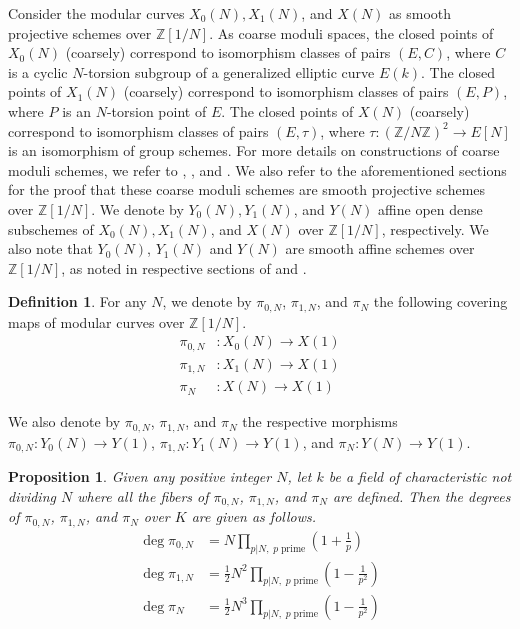 \documentclass[12pt, reqno]{amsart}
\newtheorem{proposition}[theorem]{Proposition}
\theoremstyle{definition}
\newtheorem{definition}[theorem]{Definition}
\newcommand{\Z}{\mathbb{Z}}
\begin{document}
Consider the modular curves $X_0(N), X_1(N)$, and $X(N)$ as smooth projective schemes over $\Z[1/N]$. As coarse moduli spaces, the closed points of $X_0(N)$ (coarsely) correspond to isomorphism classes of pairs $(E,C)$, where $C$ is a cyclic $N$-torsion subgroup of a generalized elliptic curve $E(k)$. The closed points of $X_1(N)$ (coarsely) correspond to isomorphism classes of pairs $(E,P)$, where $P$ is an $N$-torsion point of $E$. The closed points of $X(N)$ (coarsely) correspond to isomorphism classes of pairs $(E,\tau)$, where $\tau: (\Z/N\Z)^2 \to E[N]$ is an isomorphism of group schemes. For more details on constructions of coarse moduli schemes, we refer to \cite[Section 2]{saito}, \cite[Section 6]{shimura}, and \cite[Section 8, Section 9]{diamondim}. We also refer to the aforementioned sections for the proof that these coarse moduli schemes are smooth projective schemes over $\Z[1/N]$. We denote by $Y_0(N), Y_1(N)$, and $Y(N)$ affine open dense subschemes of $X_0(N), X_1(N)$, and $X(N)$ over $\Z[1/N]$, respectively. We also note that $Y_0(N)$, $Y_1(N)$ and $Y(N)$ are smooth affine schemes over $\Z[1/N]$, as noted in respective sections of \cite{saito} and \cite{diamondim}.

\begin{definition}\label{cover}
For any $N$, we denote by $\pi_{0,N}$, $\pi_{1,N}$, and $\pi_N$ the following covering maps of modular curves over $\Z[1/N]$.
\begin{align*}
    \pi_{0,N}&: X_0(N) \to X(1) \\
    \pi_{1,N}&: X_1(N) \to X(1) \\
    \pi_N&: X(N) \to X(1)
\end{align*}
\end{definition}
We also denote by $\pi_{0,N}$, $\pi_{1,N}$, and $\pi_N$ the respective morphisms $\pi_{0,N}: Y_0(N) \to Y(1)$, $\pi_{1,N}: Y_1(N) \to Y(1)$, and $\pi_N: Y(N) \to Y(1)$.

\begin{proposition}\label{coverdeg}
Given any positive integer $N$, let $k$ be a field of characteristic not dividing $N$ where all the fibers of $\pi_{0,N}$, $\pi_{1,N}$, and $\pi_{N}$ are defined. Then the degrees of $\pi_{0,N}$, $\pi_{1,N}$, and $\pi_N$ over $K$ are given as follows.
\begin{align*}
    \deg \pi_{0,N} &= N \prod_{p | N, \; p \; \text{prime}} \left(1 + \frac{1}{p} \right)\\
    \deg \pi_{1,N} &= \frac{1}{2} N^2 \prod_{p | N, \; p \; \text{prime}} \left(1 - \frac{1}{p^2} \right)\\
    \deg \pi_N &= \frac{1}{2} N^3 \prod_{p | N, \; p \; \text{prime}} \left(1 - \frac{1}{p^2} \right)
\end{align*}
\end{proposition}
\end{document}
